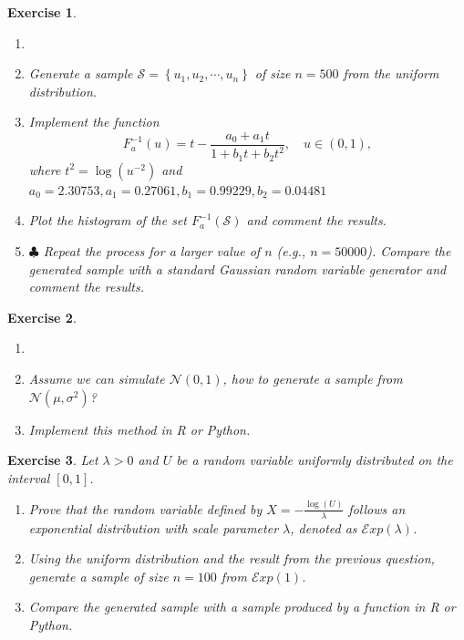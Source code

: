 \documentclass{article}\usepackage[]{graphicx}\usepackage[]{xcolor}
\newtheorem{exercise}{Exercise}
\begin{document}
  \begin{exercise}
  \begin{enumerate}
  \item[] 
  \item Generate a sample $\mathcal{S} = \left\{u_1, u_2, \cdots, u_n\right\}$ of size $n = 500$ from the uniform distribution.
  
  \item Implement the function
  \[
  F_a^{-1}(u) = t - \frac{a_0 + a_1t}{1+b_1t+b_2t^2}, \quad u\in(0,1),
  \]
  where $t^2 = \log\left(u^{-2}\right)$ and $a_0 = 2.30753, a_1 = 0.27061, b_1 = 0.99229, b_2 = 0.04481$
  
  \item Plot the histogram of the set $F_a^{-1}(\mathcal{S})$ and comment the results.
  
  \item$\clubsuit$ Repeat the process for a larger value of $n$ (e.g., $n = 50000$). Compare the generated sample with a standard Gaussian random variable generator and comment the results.
  
  \end{enumerate}
  \end{exercise}


\begin{exercise}

\begin{enumerate}
\item[]
\item Assume we can simulate $\mathcal{N}(0,1)$, how to generate a sample from $\mathcal{N}(\mu,\sigma^2)$?
\item Implement this method in R or Python.
\end{enumerate}

\end{exercise}

\begin{exercise}

Let $\lambda>0$ and $U$ be a random variable uniformly distributed on the interval $[0,1]$.
\begin{enumerate}
\item Prove that the random variable defined by $X = -\frac{\log(U)}{\lambda}$ follows an exponential distribution with scale parameter $\lambda$, denoted as $\mathcal{E}xp(\lambda)$.
\item Using the uniform distribution and the result from the previous question, generate a sample of size $n=100$ from $\mathcal{E}xp(1)$.
\item Compare the generated sample with a sample produced by a function in R or Python.
\end{enumerate}
\end{exercise}
\end{document}
